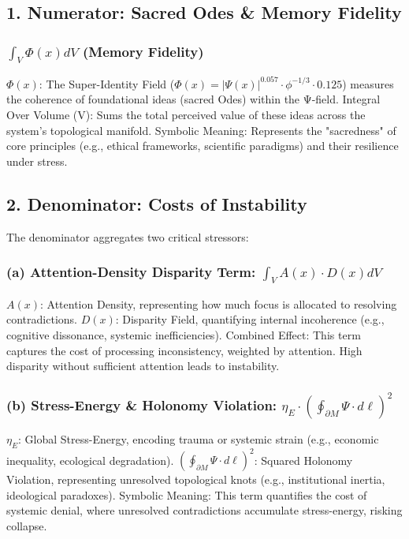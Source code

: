 \documentclass[11pt]{article}
\begin{document}
\subsection*{1. Numerator: Sacred Odes & Memory Fidelity}
\subsubsection*{\(\int_V \Phi(x)dV\) (Memory Fidelity)}
\(\Phi(x)\): The Super-Identity Field (\(\Phi(x) = |\Psi(x)|^{0.057} \cdot \phi^{-1/3} \cdot 0.125\)) measures the coherence of foundational ideas (sacred Odes) within the Ψ-field.
Integral Over Volume (V): Sums the total perceived value of these ideas across the system’s topological manifold.
Symbolic Meaning: Represents the "sacredness" of core principles (e.g., ethical frameworks, scientific paradigms) and their resilience under stress.

\subsection*{2. Denominator: Costs of Instability}
The denominator aggregates two critical stressors:
\subsubsection*{(a) Attention-Density Disparity Term: \(\int_V A(x)\cdot D(x)dV\)}
\(A(x)\): Attention Density, representing how much focus is allocated to resolving contradictions.
\(D(x)\): Disparity Field, quantifying internal incoherence (e.g., cognitive dissonance, systemic inefficiencies).
Combined Effect: This term captures the cost of processing inconsistency, weighted by attention. High disparity without sufficient attention leads to instability.

\subsubsection*{(b) Stress-Energy & Holonomy Violation: \(\eta_E \cdot (\oint_{\partial M} \Psi \cdot d\ell)^2\)}
\(\eta_E\): Global Stress-Energy, encoding trauma or systemic strain (e.g., economic inequality, ecological degradation).
\((\oint_{\partial M} \Psi \cdot d\ell)^2\): Squared Holonomy Violation, representing unresolved topological knots (e.g., institutional inertia, ideological paradoxes).
Symbolic Meaning: This term quantifies the cost of systemic denial, where unresolved contradictions accumulate stress-energy, risking collapse.
\end{document}
